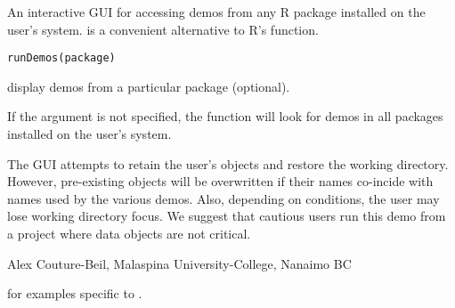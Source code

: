 \documentclass[letterpaper]{book}
\begin{document}
\begin{Description}\relax
An interactive GUI for accessing demos from any R package installed on the 
user's system.  is a convenient alternative to R's  
function.
\end{Description}
\begin{Usage}
\begin{verbatim}runDemos(package)\end{verbatim}
\end{Usage}
\begin{Arguments}
\begin{ldescription}
\item[\code{package}] display demos from a particular package (optional).
\end{ldescription}
\end{Arguments}
\begin{Details}\relax
If the argument  is not specified, the function will look for 
demos in all packages installed on the user's system.
\end{Details}
\begin{Note}\relax
The  GUI attempts to retain the user's objects and restore
the working directory. However, pre-existing objects will be overwritten 
if their names co-incide with names used by the various demos. Also, 
depending on conditions, the user may lose working directory focus. 
We suggest that cautious users run this demo from a project where data objects are 
not critical.
\end{Note}
\begin{Author}\relax
Alex Couture-Beil, Malaspina University-College, Nanaimo BC
\end{Author}
\begin{SeeAlso}\relax
{}  for examples specific to .
\end{SeeAlso}
\end{document}
